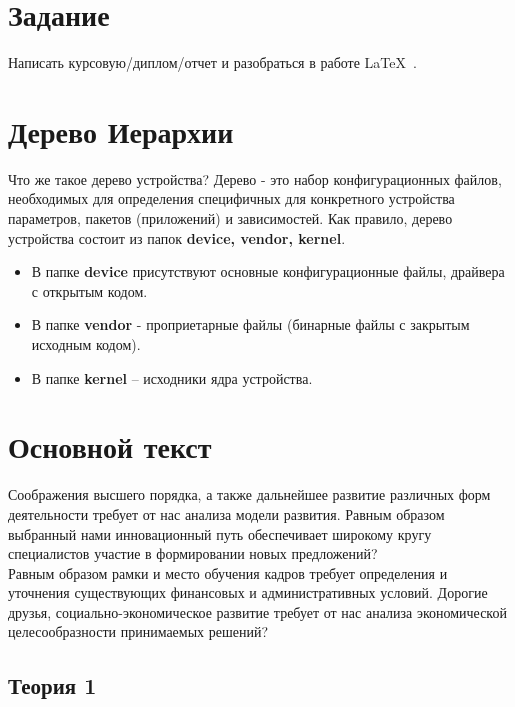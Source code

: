 
\section*{Задание}
Написать курсовую/диплом/отчет и разобраться в работе \LaTeX\ .

\section{Дерево Иерархии}
Что же такое дерево устройства? Дерево - это набор конфигурационных
файлов, необходимых для определения специфичных для конкретного устройства параметров, пакетов (приложений) и зависимостей. Как правило, дерево устройства состоит из папок \textbf{device, vendor, kernel}.
\begin{itemize}
\item В папке \textbf{device} присутствуют основные конфигурационные файлы, драйвера с открытым кодом.
\item В папке \textbf{vendor} - проприетарные файлы (бинарные файлы с закрытым исходным кодом).
\item В папке \textbf{kernel} – исходники ядра устройства.
\end{itemize}


\section{Основной текст}
Соображения высшего порядка, а также дальнейшее развитие различных форм деятельности требует от нас анализа модели развития. Равным образом выбранный нами инновационный путь обеспечивает широкому кругу специалистов участие в формировании новых предложений?\\
Равным образом рамки и место обучения кадров требует определения и уточнения существующих финансовых и административных условий.
Дорогие друзья, социально-экономическое развитие требует от нас анализа экономической целесообразности принимаемых решений? \cite{kistyakovskii} %

\subsection*{Теория 1}


